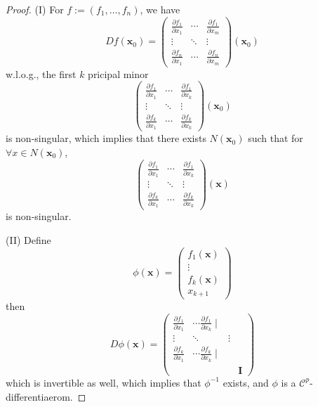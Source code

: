 \begin{proof}
(I) For $f:=(f_1,\dots,f_n)$, we have
\[
Df(\bm x_0)=\begin{pmatrix}
\frac{\partial f_1}{\partial x_1}&\cdots&\frac{\partial f_1}{\partial x_m}\\
\vdots&\ddots&\vdots\\
\frac{\partial f_n}{\partial x_1}&\cdots&\frac{\partial f_n}{\partial x_m}
\end{pmatrix}(\bm x_0)
\]
w.l.o.g., the first $k$ pricipal minor 
\[
\begin{pmatrix}
\frac{\partial f_1}{\partial x_1}&\cdots&\frac{\partial f_1}{\partial x_k}\\
\vdots&\ddots&\vdots\\
\frac{\partial f_k}{\partial x_1}&\cdots&\frac{\partial f_k}{\partial x_k}
\end{pmatrix}(\bm x_0)
\]
is non-singular, which implies that there exists $N(\bm x_0)$ such that for $\forall x\in N(\bm x_0)$,
\[
\begin{pmatrix}
\frac{\partial f_1}{\partial x_1}&\cdots&\frac{\partial f_1}{\partial x_k}\\
\vdots&\ddots&\vdots\\
\frac{\partial f_k}{\partial x_1}&\cdots&\frac{\partial f_k}{\partial x_k}
\end{pmatrix}(\bm x)
\]
is non-singular.

(II) Define
\[
\phi(\bm x)=\begin{pmatrix}
f_1(\bm x)\\\vdots\\f_k(\bm x)\\ x_{k+1}
\end{pmatrix}
\]
then
\[
D\phi(\bm x)=\begin{pmatrix}
\frac{\partial f_1}{\partial x_1}&\cdots\frac{\partial f_1}{\partial x_k}\mid &\\
\vdots&\ddots&\vdots\\
\frac{\partial f_k}{\partial x_1}&\cdots\frac{\partial f_k}{\partial x_k}\mid &\\
&&&\bm I
\end{pmatrix}
\]
which is invertible as well, which implies that $\phi^{-1}$ exists, and $\phi$ is a $\mathcal{C}^p$-differentiaerom.


\end{proof}

